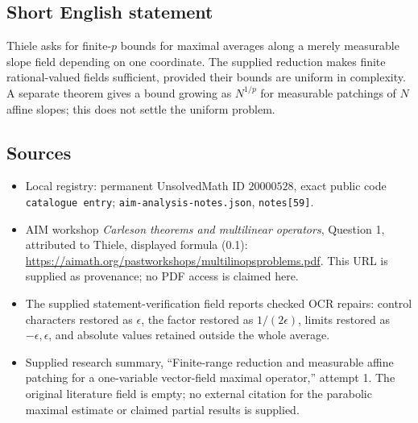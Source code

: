 \documentclass[11pt]{article}
\begin{document}
\subsection{Short English statement}
Thiele asks for finite-\(p\) bounds for maximal averages along a merely measurable slope field depending on one coordinate. The supplied reduction makes finite rational-valued fields sufficient, provided their bounds are uniform in complexity. A separate theorem gives a bound growing as \(N^{1/p}\) for measurable patchings of \(N\) affine slopes; this does not settle the uniform problem.
\subsection{Sources}
\begin{itemize}
\item Local registry: permanent UnsolvedMath ID \(20000528\), exact public code \texttt{catalogue entry}; \texttt{aim-analysis-notes.json}, \texttt{notes[59]}.
\item AIM workshop \emph{Carleson theorems and multilinear operators}, Question 1, attributed to Thiele, displayed formula (0.1): \url{https://aimath.org/pastworkshops/multilinopsproblems.pdf}. This URL is supplied as provenance; no PDF access is claimed here.
\item The supplied statement-verification field reports checked OCR repairs: control characters restored as \(\epsilon\), the factor restored as \(1/(2\epsilon)\), limits restored as \(-\epsilon,\epsilon\), and absolute values retained outside the whole average.
\item Supplied research summary, ``Finite-range reduction and measurable affine patching for a one-variable vector-field maximal operator,'' attempt 1. The original literature field is empty; no external citation for the parabolic maximal estimate or claimed partial results is supplied.
\end{itemize}
\end{document}
